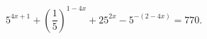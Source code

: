 \begin{ex}[type=equation]
	\begin{condition}
		$5^{4x + 1} + \left(\dfrac{1}{5}\right)^{1 - 4x} + 25^{2x} - 5^{-(2 - 4x)} = 770.$
	\end{condition}
\end{ex}